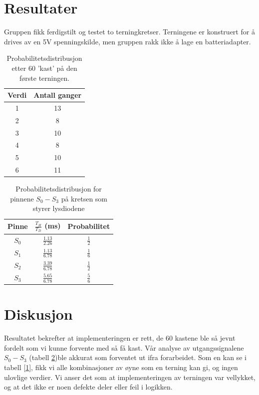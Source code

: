 \documentclass[12pt,norsk,a4paper]{article}
\begin{document}
\section{Resultater}
Gruppen fikk ferdigstilt og testet to terningkretser. Terningene er konstruert for å drives av en 5V spenningskilde, men gruppen rakk ikke å lage en batteriadapter. 


\begin{table}[H]
    \begin{center}
    \begin{tabular}{|c|c|}
    \hline
    Verdi & Antall ganger\\ \hline
    1 & 13 \\ \hline
    2 & 8  \\ \hline
    3 & 10 \\ \hline
    4 & 8  \\ \hline
    5 & 10 \\ \hline
    6 & 11 \\ \hline
    \end{tabular}
    \caption{Probabilitetsdistribusjon etter 60 'kast' på den første terningen.}
    \label{tbl:probabilitetsdistribusjon}
    \end{center}
    \end{table}


\begin{table}[H]
    \begin{center}
    \begin{tabular}{|c|c|c|}
    \hline
    Pinne & $\frac{T_H}{T_D}$ (ms) & Probabilitet   \\[1mm] \hline
    $S_0$ & $\frac{1.13}{2.26}$  & $\frac{1}{2}$    \\[1mm] \hline
    $S_1$ & $\frac{1.13}{6.78}$  & $\frac{1}{6}$    \\[1mm] \hline
    $S_2$ & $\frac{3.39}{6.78}$  & $\frac{1}{2}$    \\[1mm]\hline
    $S_3$ & $\frac{5.65}{6.78}$  & $\frac{5}{6}$    \\[1mm] \hline
    \end{tabular}
    \caption{Probabilitetsdistribusjon for pinnene $S_0 - S_3$  på kretsen som styrer lysdiodene}
    \label{tbl:probe}
    \end{center}
    \end{table}

\clearpage

\section{Diskusjon}
Resultatet bekrefter at implementeringen er rett, de 60 kastene ble så jevnt fordelt som vi kunne forvente med så få kast. Vår analyse av utgangssignalene $S_0 - S_3$ (tabell \ref{tbl:probe})ble akkurat som forventet ut ifra forarbeidet. Som en kan se i tabell [\ref{tbl:probabilitetsdistribusjon}], fikk vi alle kombinasjoner av øyne som en terning kan gi, og ingen ulovlige verdier. Vi anser det som at implementeringen av terningen var vellykket, og at det ikke er noen defekte deler eller feil i logikken. 
\end{document}

